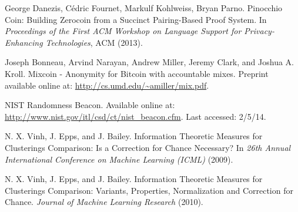 \documentclass[conference]{IEEEtran}
\begin{document}
\begin{thebibliography}{1}
 George Danezis, C\'{e}dric Fournet, Markulf Kohlweiss, Bryan Parno. Pinocchio Coin: Building Zerocoin from a Succinct Pairing-Based Proof System. In \emph{Proceedings of the First ACM Workshop on Language Support for Privacy-Enhancing Technologies}, ACM (2013).

 Joseph Bonneau, Arvind Narayan, Andrew Miller, Jeremy Clark, and Joshua A. Kroll. Mixcoin - Anonymity for Bitcoin with accountable mixes. Preprint available online at: \url{http://cs.umd.edu/~amiller/mix.pdf}.

 NIST Randomness Beacon. Available online at: \url{http://www.nist.gov/itl/csd/ct/nist_beacon.cfm}. Last accessed: 2/5/14.

 N. X. Vinh, J. Epps, and J. Bailey. Information Theoretic Measures for Clusterings Comparison: Is a Correction for Chance Necessary? In \emph{26th Annual International Conference on Machine Learning (ICML)} (2009).

 N. X. Vinh, J. Epps, and J. Bailey. Information Theoretic Measures for Clusterings Comparison: Variants, Properties, Normalization and Correction for Chance. \emph{Journal of Machine Learning Research} (2010).

\end{thebibliography}




\end{document}
